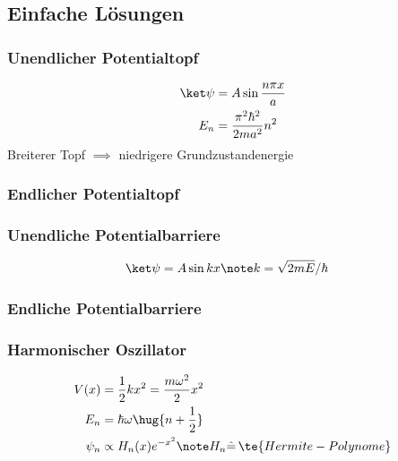 \documentclass[twocolumn, unnumberedsubsub]{summery_5.0} %
\begin{document}
\subsection{Einfache Lösungen}
\subsubsection{Unendlicher Potentialtopf}\tight
\begin{align*}
    \ket \psi &= A\sin\frac{n\pi x}{a} \\
    E_n &= \frac{\pi^2\hbar^2}{2m a^2} n^2
\end{align*}
Breiterer Topf \(\implies\) niedrigere Grundzustandenergie

\subsubsection{Endlicher Potentialtopf}

\subsubsection{Unendliche Potentialbarriere}\tight
\begin{align*}
    \ket \psi &= A\sin kx \note k=\sqrt{2m E} /\hbar
\end{align*}
\subsubsection{Endliche Potentialbarriere}
\subsubsection{Harmonischer Oszillator}\tight
\begin{align*}
    V(x) &= \frac12k x^2 = \frac{m\omega^2}{2}x^2\\
    E_n &= \hbar \omega\hug{n+\frac12}\\
    \psi_n &\propto H_n(x) e^{-x^2}\note H_n \hat =\, \te{Hermite-Polynome}
\end{align*}
\end{document}
